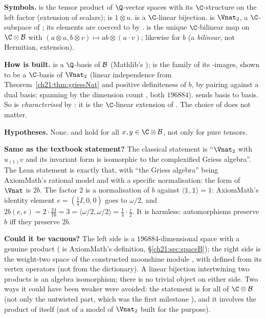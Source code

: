 \begin{dictionary}
\textbf{Symbols.}   is the tensor product of $\Q$-vector spaces with its
$\C$-structure on the left factor (extension of scalars);  is $1\otimes u$.
 is a $\C$-linear bijection.   is $\Vnat_2$, a $\C$-subspace of
; its elements are coerced to  by .
 is the unique $\C$-bilinear map on $\C\otimes\chXXIB$ with
$(a\otimes u,b\otimes v)\mapsto ab\otimes(u\cdot v)$; 
likewise for $b$ (a \emph{bilinear}, not Hermitian, extension).

\textbf{How  is built.}   is a $\Q$-basis of $\mathcal{B}$ (Mathlib's
);  is the family of its -images, shown to be a
$\C$-basis of $\Vnat_2$ (linear independence from Theorem~\ref{ch21:thm:griessNat} and positive
definiteness of $b$, by pairing against a dual basis; spanning by the dimension count
, both $196884$).
 sends basis to basis.  So  is \emph{characterised} by
: it is the $\C$-linear extension of .  The choice of
 does not matter.

\textbf{Hypotheses.}  None.   and  hold for all
$x,y\in\C\otimes\chXXIB$, not only for pure tensors.

\textbf{Same as the textbook statement?}  The classical statement is ``$\Vnat_2$ with $u_{(1)}v$ and its
invariant form is isomorphic to the complexified Griess algebra''.  The Lean statement is exactly that,
with ``the Griess algebra'' being AxiomMath's rational model and with a specific normalisation:
the form of $\Vnat$ is $2b$.  The factor $2$ is a normalisation of $b$ against
$\langle\mathbb1,\mathbb1\rangle=1$: AxiomMath's identity element $e=(\tfrac14I,0,0)$ goes to
$\omega/2$, and $2b(e,e)=2\cdot\tfrac{24}{16}=3=\langle\omega/2,\omega/2\rangle=\tfrac14\cdot\tfrac c2$.
It is harmless: automorphisms preserve $b$ iff they preserve $2b$.

\textbf{Could it be vacuous?}  The left side is a $196884$-dimensional space with a genuine product
( is AxiomMath's definition, \S\ref{ch21:sec:spaceB}); the right side is the weight-two space
of the constructed moonshine module , with  defined from its vertex
operators (not from the dictionary).  A linear bijection intertwining two products is an algebra
isomorphism; there is no trivial object on either side.  Two ways it could have been weaker were
avoided: the statement is for all of $\C\otimes\chXXIB$ (not only the untwisted part, which was the first
milestone ), and it involves the product of  itself (not of a
model of $\Vnat_2$ built for the purpose).


\end{dictionary}
